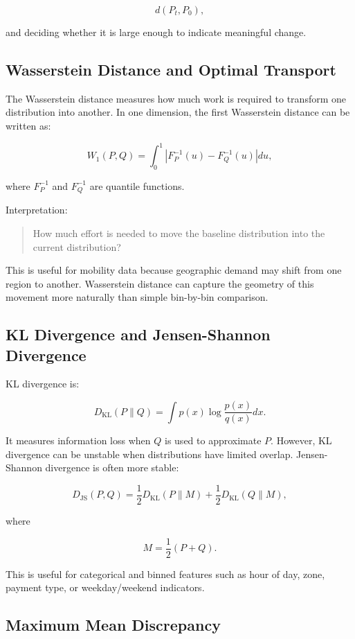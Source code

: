 \documentclass[11pt]{article}
\begin{document}
\[
    d(P_t, P_0),
\]

and deciding whether it is large enough to indicate meaningful change.

\subsection{Wasserstein Distance and Optimal Transport}

The Wasserstein distance measures how much work is required to transform one distribution into another. In one dimension, the first Wasserstein distance can be written as:

\[
    W_1(P,Q) = \int_0^1 \left|F_P^{-1}(u) - F_Q^{-1}(u)\right|du,
\]

where $F_P^{-1}$ and $F_Q^{-1}$ are quantile functions.

Interpretation:

\begin{quote}
    How much effort is needed to move the baseline distribution into the current distribution?
\end{quote}

This is useful for mobility data because geographic demand may shift from one region to another. Wasserstein distance can capture the geometry of this movement more naturally than simple bin-by-bin comparison.

\subsection{KL Divergence and Jensen-Shannon Divergence}

KL divergence is:

\[
    D_{\mathrm{KL}}(P\|Q) = \int p(x)\log\frac{p(x)}{q(x)}dx.
\]

It measures information loss when $Q$ is used to approximate $P$. However, KL divergence can be unstable when distributions have limited overlap. Jensen-Shannon divergence is often more stable:

\[
    D_{\mathrm{JS}}(P,Q) = \frac{1}{2}D_{\mathrm{KL}}(P\|M) + \frac{1}{2}D_{\mathrm{KL}}(Q\|M),
\]

where

\[
    M = \frac{1}{2}(P+Q).
\]

This is useful for categorical and binned features such as hour of day, zone, payment type, or weekday/weekend indicators.

\subsection{Maximum Mean Discrepancy}
\end{document}
